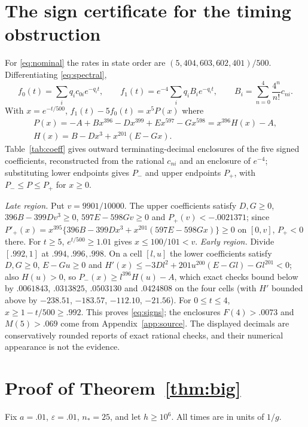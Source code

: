 \documentclass[11pt,a4paper]{article}
\theoremstyle{plain}
\theoremstyle{definition}
\theoremstyle{remark}
\newcommand{\eps}{\varepsilon}
\begin{document}
\section{The sign certificate for the timing obstruction}\label{app:certificate}
For \eqref{eq:nominal} the rates in state order are $(5,404,603,602,401)/500$. Differentiating \eqref{eq:spectral},
\[
f_0(t)=\sum_iq_ic_{0i}e^{-q_it},\qquad f_1(t)=e^{-4}\sum_iq_iB_ie^{-q_it},\qquad B_i=\sum_{n=0}^4\frac{4^n}{n!}c_{ni}.
\]
With $x=e^{-t/500}$, $f_1(t)-5f_0(t)=x^5P(x)$ where
\begin{gather*}
P(x)=-A+Bx^{396}-Dx^{399}+Ex^{597}-Gx^{598}=x^{396}H(x)-A,\\
H(x)=B-Dx^3+x^{201}(E-Gx) .
\end{gather*}
Table~\ref{tab:coeff} gives outward terminating-decimal enclosures of the five signed coefficients, reconstructed from the rational $c_{ni}$ and an enclosure of $e^{-4}$; substituting lower endpoints gives $P_-$ and upper endpoints $P_+$, with $P_-\le P\le P_+$ for $x\ge0$.
\begin{table}[htbp]\centering\small

\caption{Outward coefficient enclosures (regenerated by \texttt{check\_paper.py}); the formal proof uses the same source identities with a slightly different exact enclosure and the same four-cell argument.}\label{tab:coeff}
\end{table}
\emph{Late region.} Put $v=9901/10000$. The upper coefficients satisfy $D,G\ge0$, $396B-399Dv^3\ge0$, $597E-598Gv\ge0$ and $P_+(v)<-.0021371$; since $P'_+(x)=x^{395}\{396B-399Dx^3+x^{201}(597E-598Gx)\}\ge0$ on $[0,v]$, $P_+<0$ there. For $t\ge5$, $e^{t/500}\ge1.01$ gives $x\le100/101<v$. \emph{Early region.} Divide $[.992,1]$ at $.994,.996,.998$. On a cell $[l,u]$ the lower coefficients satisfy $D,G\ge0$, $E-Gu\ge0$ and $H'(x)\le-3Dl^2+201u^{200}(E-Gl)-Gl^{201}<0$; also $H(u)>0$, so $P_-(x)\ge l^{396}H(u)-A$, which exact checks bound below by $.0061843$, $.0313825$, $.0503130$ and $.0424808$ on the four cells (with $H'$ bounded above by $-238.51$, $-183.57$, $-112.10$, $-21.56$). For $0\le t\le4$, $x\ge1-t/500\ge.992$. This proves \eqref{eq:signs}; the enclosures $F(4)>.0073$ and $M(5)>.069$ come from Appendix~\ref{app:source}. The displayed decimals are conservatively rounded reports of exact rational checks, and their numerical appearance is not the evidence.

\section{Proof of Theorem~\ref{thm:big}}\label{app:big}
Fix $a=.01$, $\eps=.01$, $n_*=25$, and let $h\ge10^{6}$. All times are in units of $1/g$.
\end{document}

